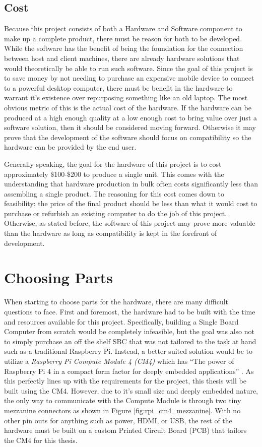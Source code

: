 \subsection{Cost}\label{subsec:HardwareCost}

Because this project consists of both a Hardware and Software component to make up a complete product, there must be reason for both to be developed.
While the software has the benefit of being the foundation for the connection between host and client machines, there are already hardware solutions that would theoretically be able to run such software.
Since the goal of this project is to save money by not needing to purchase an expensive mobile device to connect to a powerful desktop computer, there must be benefit in the hardware to warrant it's existence over repurposing something like an old laptop.
The most obvious metric of this is the actual cost of the hardware.
If the hardware can be produced at a high enough quality at a low enough cost to bring value over just a software solution, then it should be considered moving forward.
Otherwise it may prove that the development of the software should focus on compatibility so the hardware can be provided by the end user.

Generally speaking, the goal for the hardware of this project is to cost approximately \$100-\$200 to produce a single unit.
This comes with the understanding that hardware production in bulk often costs significantly less than assembling a single product.
The reasoning for this cost comes down to feasibility: the price of the final product should be less than what it would cost to purchase or refurbish an existing computer to do the job of this project.
Otherwise, as stated before, the software of this project may prove more valuable than the hardware as long as compatibility is kept in the forefront of development.


\section{Choosing Parts}\label{sec:ChoosingParts}

When starting to choose parts for the hardware, there are many difficult questions to face.
First and foremost, the hardware had to be built with the time and resources available for this project.
Specifically, building a Single Board Computer from scratch would be completely infeasible, but the goal was also not to simply purchase an off the shelf SBC that was not tailored to the task at hand such as a traditional Raspberry Pi.
Instead, a better suited solution would be to utilize a \emph{Raspberry Pi Compute Module 4 (CM4)} which has \enquote{The power of Raspberry Pi 4 in a compact form factor for deeply embedded applications} \cite{rpi_cm4}.
As this perfectly lines up with the requirements for the project, this thesis will be built using the CM4.
However, due to it's small size and deeply embedded nature, the only way to communicate with the Compute Module is through two tiny mezzanine connectors as shown in Figure \ref{fig:rpi_cm4_mezzanine}.
With no other pin outs for anything such as power, HDMI, or USB, the rest of the hardware must be built on a custom Printed Circuit Board (PCB) that tailors the CM4 for this thesis.

